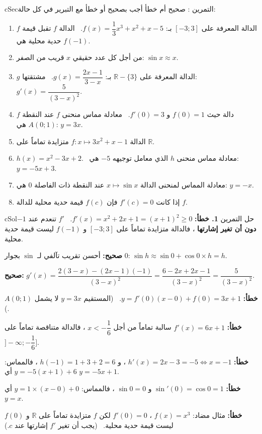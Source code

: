 \documentclass[12pt,a4paper]{article}
\newenvironment{BOX}[2]{\begin{otherlanguage}{english}\begin{arbox}{#1}{#2}}{\end{arbox}\end{otherlanguage}}
\newcounter{exo}
\newenvironment{tamrin}[1]{\stepcounter{exo}\begin{BOX}{cSec}{التمرين \theexo: #1}}{\end{BOX}}
\newenvironment{hal}{\Needspace{12\baselineskip}\begin{otherlanguage}{english}\begin{arbox}[breakable]{cSol}{حل التمرين \theexo}}{\end{arbox}\end{otherlanguage}}
\newcommand{\R}{\mathbb{R}}
\begin{document}
\begin{tamrin}{صحيح أم خطأ}
أجب بصحيح أو خطأ مع التبرير في كل حالة:
\begin{enumerate}
\item $f$ الدالة المعرفة على $[-3;3]$ بـ: $f(x)=\dfrac13x^3+x^2+x-5$. \ الدالة $f$ تقبل قيمة حدية محلية هي $f(-1)$.
\item من أجل كل عدد حقيقي $x$ قريب من الصفر: $\sin x\approx x$.
\item $g$ الدالة المعرفة على $\R-\{3\}$ بـ: $g(x)=\dfrac{2x-1}{3-x}$. \ مشتقتها: $g'(x)=\dfrac{5}{(3-x)^2}$.
\item $f$ دالة حيث $f(0)=1$ و $f'(0)=3$. \ معادلة مماس منحنى $f$ عند النقطة $A(0;1)$ هي: $y=3x$.
\item الدالة $f:x\mapsto3x^2+x-1$ متزايدة تماماً على $\R$.
\item $h(x)=x^2-3x+2$. \ معادلة مماس منحنى $h$ الذي معامل توجيهه $-5$ هي: $y=-5x+3$.
\item معادلة المماس لمنحنى الدالة $x\mapsto\sin x$ عند النقطة ذات الفاصلة $0$ هي: $y=-x$.
\item إذا كانت $f'(c)=0$ فإن $f(c)$ قيمة حدية محلية للدالة $f$.
\end{enumerate}
\end{tamrin}
\begin{hal}
\textbf{1. خطأ:} $f'(x)=x^2+2x+1=(x+1)^2\ge0$. \ $f'$ تنعدم عند $-1$ \textbf{دون أن تغير إشارتها} ، فالدالة متزايدة تماماً على $[-3;3]$ و $f(-1)$ ليست قيمة حدية محلية.

 \textbf{صحيح:} أحسن تقريب تآلفي لـ $\sin$ بجوار $0$: $\sin h\approx\sin0+\cos0\times h=h$.

 \textbf{صحيح:} $g'(x)=\dfrac{2(3-x)-(2x-1)(-1)}{(3-x)^2}=\dfrac{6-2x+2x-1}{(3-x)^2}=\dfrac{5}{(3-x)^2}$.

 \textbf{خطأ:} $y=f'(0)(x-0)+f(0)=3x+1$. \ (المستقيم $y=3x$ لا يشمل $A(0;1)$.)

 \textbf{خطأ:} $f'(x)=6x+1$ سالبة تماماً من أجل $x<-\dfrac16$ ، فالدالة متناقصة تماماً على $\Big]-\infty;-\dfrac16\Big]$.

 \textbf{خطأ:} $h'(x)=2x-3=-5\iff x=-1$ ، و $h(-1)=1+3+2=6$ ، فالمماس: $y=-5(x+1)+6$ أي $y=-5x+1$.

 \textbf{خطأ:} $\sin'(0)=\cos0=1$ و $\sin0=0$ ، فالمماس: $y=1\times(x-0)+0$ أي $y=x$.

 \textbf{خطأ:} مثال مضاد: $f(x)=x^3$ ، $f'(0)=0$ لكن $f$ متزايدة تماماً على $\R$ و $f(0)$ ليست قيمة حدية محلية. \ (يجب أن تغير $f'$ إشارتها عند $c$.)
\end{hal}
\end{document}

